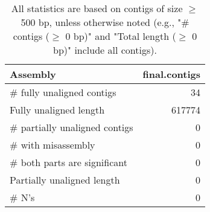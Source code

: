 \documentclass[12pt,a4paper]{article}
\begin{document}
\begin{table}[ht]
\begin{center}
\caption{All statistics are based on contigs of size $\geq$ 500 bp, unless otherwise noted (e.g., "\# contigs ($\geq$ 0 bp)" and "Total length ($\geq$ 0 bp)" include all contigs).}
\begin{tabular}{|l*{1}{|r}|}
\hline
Assembly & final.contigs \\ \hline
\# fully unaligned contigs & 34 \\ \hline
Fully unaligned length & 617774 \\ \hline
\# partially unaligned contigs & 0 \\ \hline
\hspace{5mm}\# with misassembly & 0 \\ \hline
\hspace{5mm}\# both parts are significant & 0 \\ \hline
Partially unaligned length & 0 \\ \hline
\# N's & 0 \\ \hline
\end{tabular}
\end{center}
\end{table}
\end{document}
